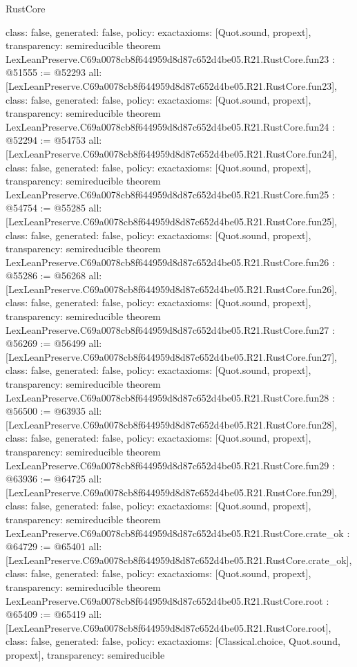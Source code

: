 \begin{lexlean}{RustCore}
\begin{coremodule}
{  class: false,
  generated: false,
  policy: exact{axioms: [Quot.sound, propext]},
  transparency: semireducible
}
theorem LexLeanPreserve.C69a0078cb8f644959d8d87c652d4be05.R21.RustCore.fun23 : @51555 := @52293 {
  all: [LexLeanPreserve.C69a0078cb8f644959d8d87c652d4be05.R21.RustCore.fun23],
  class: false,
  generated: false,
  policy: exact{axioms: [Quot.sound, propext]},
  transparency: semireducible
}
theorem LexLeanPreserve.C69a0078cb8f644959d8d87c652d4be05.R21.RustCore.fun24 : @52294 := @54753 {
  all: [LexLeanPreserve.C69a0078cb8f644959d8d87c652d4be05.R21.RustCore.fun24],
  class: false,
  generated: false,
  policy: exact{axioms: [Quot.sound, propext]},
  transparency: semireducible
}
theorem LexLeanPreserve.C69a0078cb8f644959d8d87c652d4be05.R21.RustCore.fun25 : @54754 := @55285 {
  all: [LexLeanPreserve.C69a0078cb8f644959d8d87c652d4be05.R21.RustCore.fun25],
  class: false,
  generated: false,
  policy: exact{axioms: [Quot.sound, propext]},
  transparency: semireducible
}
theorem LexLeanPreserve.C69a0078cb8f644959d8d87c652d4be05.R21.RustCore.fun26 : @55286 := @56268 {
  all: [LexLeanPreserve.C69a0078cb8f644959d8d87c652d4be05.R21.RustCore.fun26],
  class: false,
  generated: false,
  policy: exact{axioms: [Quot.sound, propext]},
  transparency: semireducible
}
theorem LexLeanPreserve.C69a0078cb8f644959d8d87c652d4be05.R21.RustCore.fun27 : @56269 := @56499 {
  all: [LexLeanPreserve.C69a0078cb8f644959d8d87c652d4be05.R21.RustCore.fun27],
  class: false,
  generated: false,
  policy: exact{axioms: [Quot.sound, propext]},
  transparency: semireducible
}
theorem LexLeanPreserve.C69a0078cb8f644959d8d87c652d4be05.R21.RustCore.fun28 : @56500 := @63935 {
  all: [LexLeanPreserve.C69a0078cb8f644959d8d87c652d4be05.R21.RustCore.fun28],
  class: false,
  generated: false,
  policy: exact{axioms: [Quot.sound, propext]},
  transparency: semireducible
}
theorem LexLeanPreserve.C69a0078cb8f644959d8d87c652d4be05.R21.RustCore.fun29 : @63936 := @64725 {
  all: [LexLeanPreserve.C69a0078cb8f644959d8d87c652d4be05.R21.RustCore.fun29],
  class: false,
  generated: false,
  policy: exact{axioms: [Quot.sound, propext]},
  transparency: semireducible
}
theorem LexLeanPreserve.C69a0078cb8f644959d8d87c652d4be05.R21.RustCore.crate_ok : @64729 := @65401 {
  all: [LexLeanPreserve.C69a0078cb8f644959d8d87c652d4be05.R21.RustCore.crate_ok],
  class: false,
  generated: false,
  policy: exact{axioms: [Quot.sound, propext]},
  transparency: semireducible
}
theorem LexLeanPreserve.C69a0078cb8f644959d8d87c652d4be05.R21.RustCore.root : @65409 := @65419 {
  all: [LexLeanPreserve.C69a0078cb8f644959d8d87c652d4be05.R21.RustCore.root],
  class: false,
  generated: false,
  policy: exact{axioms: [Classical.choice, Quot.sound, propext]},
  transparency: semireducible
}


\end{coremodule}
\end{lexlean}

